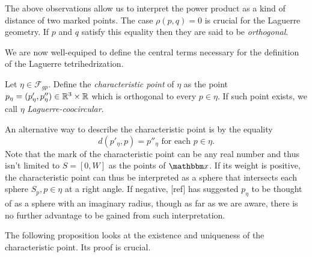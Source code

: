 The above observations allow us to interpret the power product as a kind of distance of two marked points. The case $\rho(p,q)=0$ is crucial for the Laguerre geometry. If $p$ and $q$ satisfy this equality then they are said to be \textit{orthogonal}. 

We are now well-equiped to define the central terms necessary for the definition of the Laguerre tetrihedrization.

\begin{definition}
	Let $\eta\in\mathcal F_{gp}$. Define the \textit{characteristic point} of $\eta$ as the point $p_{\eta} = (p'_\eta, p''_\eta) \in {\mathbb R^3} \times \mathbb R$ which is orthogonal to every $p\in \eta$. If such point exists, we call $\eta$ \textit{Laguerre-coocircular}. 
\end{definition}
An alternative way to describe the characteristic point is by the equality 
\begin{equation}\label{eq:charpoint}
	d(p'_\eta,p)=p''_\eta \text{ for each } p \in \eta.
\end{equation}
Note that the mark of the characteristic point can be any real number and thus isn't limited to $S=[0,W]$ as the points of $\x$.
If its weight is positive, the characteristic point can thus be interpreted as a sphere that intersects each sphere $S_p, p\in\eta$ at a right angle. If negative, [ref] has suggested $p_\eta$ to be thought of as a sphere with an imaginary radius, though as far as we are aware, there is no further advantage to be gained from such interpretation. \newline

The following proposition looks at the existence and uniqueness of the characteristic point. Its proof is crucial.



